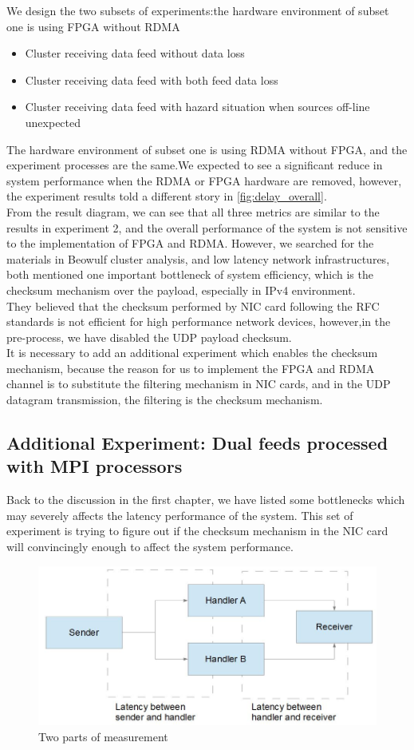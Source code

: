 \documentclass[11pt,openright,a4paper]{report}
\begin{document}
We design the two subsets of experiments:the hardware environment of subset one is using FPGA without RDMA
\begin{itemize}
	\item Cluster receiving data feed without data loss
	\item Cluster receiving data feed with both feed data loss
	\item Cluster receiving data feed with hazard situation when sources off-line unexpected
\end{itemize}
The hardware environment of subset one is using RDMA without FPGA, and the experiment processes are the same.We expected to see a significant reduce in system performance when the RDMA or FPGA hardware are removed, however, the experiment results told a different story in \ref{fig:delay_overall}.\\
From the result diagram, we can see that all three metrics are similar to the results in experiment 2, and the overall performance of the system is not sensitive to the implementation of FPGA and RDMA. However, we searched for the materials in Beowulf cluster analysis\cite{sterling2002beowulf}, and low latency network infrastructures\cite{thekkath1993limits}, both mentioned one important bottleneck of system efficiency, which is the checksum mechanism over the payload, especially in IPv4 environment.\\
They believed that the checksum performed by NIC card following the RFC standards is not efficient for high performance network devices, however,in the pre-process, we have disabled the UDP payload checksum.\\
It is necessary to add an additional experiment which enables the checksum mechanism, because the reason for us to implement the FPGA and RDMA channel is to substitute the filtering mechanism in NIC cards, and in the UDP datagram transmission, the filtering is the checksum mechanism.\\
\subsection{Additional Experiment: Dual feeds processed with MPI processors}
Back to the discussion in the first chapter, we have listed some bottlenecks which may severely affects the latency performance of the system. This set of experiment is trying to figure out if the checksum mechanism in the NIC card will convincingly enough to affect the system performance.\\
\begin{figure}[H]
	\centering
	\includegraphics[width=0.7\linewidth]{picture/addExperi}
	\caption{Two parts of measurement}
	\label{fig:addExperi}
\end{figure}
\end{document}
